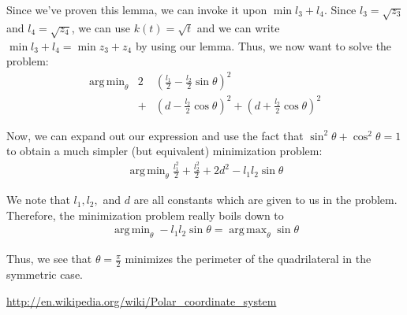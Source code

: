 \documentclass[12pt]{amsart}   %
\DeclareMathOperator*{\argmin}{arg\,min}
\DeclareMathOperator*{\argmax}{arg\,max}
\begin{document}
Since we've proven this lemma, we can invoke it upon $\min l_3 + l_4$. Since $l_3 = \sqrt{z_3}$ and $l_4 = \sqrt{z_4}$, we can use $k(t) = \sqrt{t}$ and we can write $\min l_3 + l_4 = \min z_3 + z_4$ by using our lemma. Thus, we now want to solve the problem:
\begin{eqnarray}
  \argmin_{\theta} &2& \left(\frac{l_1}{2} - \frac{l_2}{2} \sin \theta \right)^2 \\
  &+& \left( d - \frac{l_2}{2} \cos \theta \right)^2 + \left( d + \frac{l_2}{2} \cos \theta \right)^2
\end{eqnarray}

Now, we can expand out our expression and use the fact that $\sin^2 \theta + \cos^2 \theta = 1$ to obtain a much simpler (but equivalent) minimization problem:
\begin{eqnarray}
  \argmin_{\theta} \frac{l_1^2}{2} + \frac{l_2^2}{2} + 2d^2 - l_1 l_2 \sin \theta
\end{eqnarray}

We note that $l_1, l_2,$ and $d$ are all constants which are given to us in the problem. Therefore, the minimization problem really boils down to
\begin{eqnarray}
  \argmin_{\theta} - l_1 l_2 \sin \theta = \argmax_{\theta} \sin \theta
\end{eqnarray}

Thus, we see that $\theta = \frac{\pi}{2}$ minimizes the perimeter of the quadrilateral in the symmetric case.


\begin{thebibliography}{9}
\url{http://en.wikipedia.org/wiki/Polar_coordinate_system}
\end{thebibliography}
\end{document}
